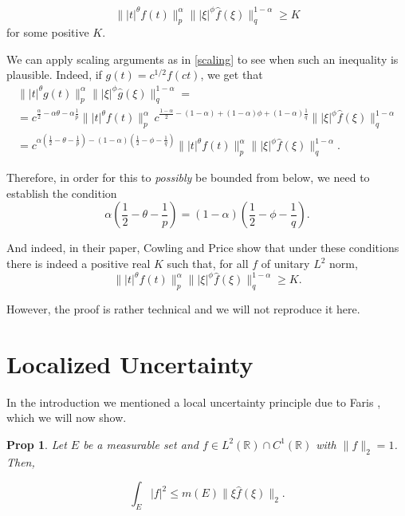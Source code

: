 \documentclass{amsart}
\newcommand{\R}{\mathbb{R}}
\newtheorem{prop}{Prop}
\begin{document}
\[\lVert \lvert t \rvert^\theta f(t) \rVert_p^\alpha  \lVert \lvert \xi \rvert^\phi \hat f(\xi) \rVert_q^{1-\alpha} \geq K\]
for some positive $K$.

We can apply scaling arguments as in \eqref{scaling} to see when such an inequality is plausible. Indeed, if $g(t) = c^{1/2} f(ct)$, we get that
\begin{multline*}
\lVert \lvert t \rvert^\theta g(t) \rVert_p^\alpha  \lVert \lvert \xi \rvert^\phi \hat g(\xi) \rVert_q^{1-\alpha} =\\
= c^{\frac\alpha2 - \alpha\theta - \alpha\frac1p} \lVert \lvert t \rvert^\theta f(t) \rVert_p^\alpha \, c^{\frac{1-\alpha}2 - (1-\alpha) + (1-\alpha)\phi + (1-\alpha)\frac1q} \lVert \lvert \xi \rvert^\phi \hat f(\xi) \rVert_q^{1-\alpha}\\
= c^{\alpha(\frac12 - \theta - \frac1p) - (1-\alpha)(\frac12 - \phi - \frac1q)}\lVert \lvert t \rvert^\theta f(t) \rVert_p^\alpha  \lVert \lvert \xi \rvert^\phi \hat f(\xi) \rVert_q^{1-\alpha}.
\end{multline*}

Therefore, in order for this to \emph{possibly} be bounded from below, we need to establish the condition
\[\alpha(\frac12 - \theta - \frac1p) = (1-\alpha)(\frac12 - \phi - \frac1q).\]

And indeed, in their paper, Cowling and Price show that under these conditions there is indeed a positive real $K$ such that, for all $f$ of unitary $L^2$ norm,
\[\lVert \lvert t \rvert^\theta f(t) \rVert_p^\alpha  \lVert \lvert \xi \rvert^\phi \hat f(\xi) \rVert_q^{1-\alpha} \geq K.\]

However, the proof is rather technical and we will not reproduce it here.

\section{Localized Uncertainty}

In the introduction we mentioned a local uncertainty principle due to Faris \cite{faris}, which we will now show.

\begin{prop}\label{localheisenberg}
Let $E$ be a measurable set and $f \in L^2(\R) \cap C^1(\R)$ with $\lVert f \rVert_2 = 1$. Then,

\[\int_E \lvert f \rvert^2 \leq m(E) \lVert \xi \hat f(\xi) \rVert_2.\]
\end{prop}
\end{document}
